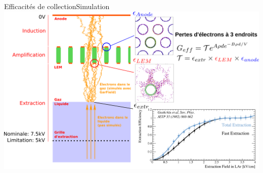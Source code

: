     \begin{frame}{Efficacités de collection}{Simulation}
		\flushleft\includegraphics[width=\textwidth]{./pictures/coll_proba_2.png}
    \end{frame}
    
